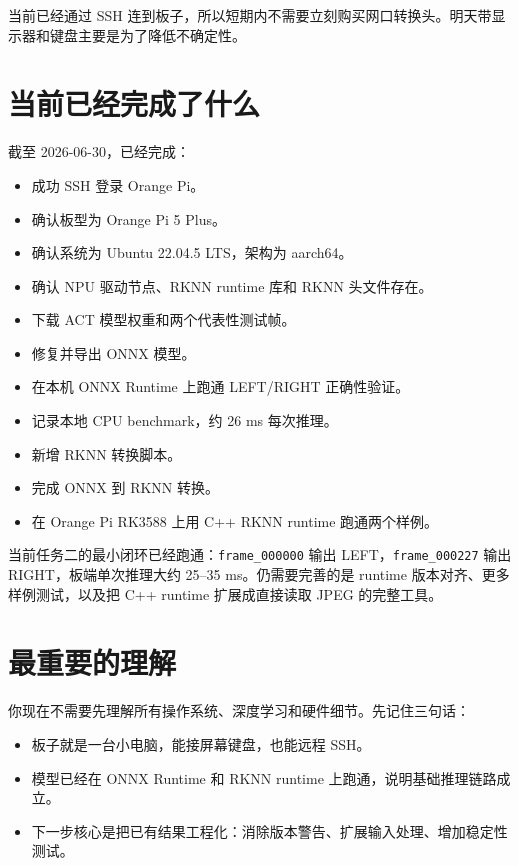 \documentclass[UTF8,a4paper,11pt]{ctexart}
\begin{document}
当前已经通过 SSH 连到板子，所以短期内不需要立刻购买网口转换头。明天带显示器和键盘主要是为了降低不确定性。

\section{当前已经完成了什么}

截至 2026-06-30，已经完成：

\begin{itemize}
  \item 成功 SSH 登录 Orange Pi。
  \item 确认板型为 Orange Pi 5 Plus。
  \item 确认系统为 Ubuntu 22.04.5 LTS，架构为 aarch64。
  \item 确认 NPU 驱动节点、RKNN runtime 库和 RKNN 头文件存在。
  \item 下载 ACT 模型权重和两个代表性测试帧。
  \item 修复并导出 ONNX 模型。
  \item 在本机 ONNX Runtime 上跑通 LEFT/RIGHT 正确性验证。
  \item 记录本地 CPU benchmark，约 26 ms 每次推理。
  \item 新增 RKNN 转换脚本。
  \item 完成 ONNX 到 RKNN 转换。
  \item 在 Orange Pi RK3588 上用 C++ RKNN runtime 跑通两个样例。
\end{itemize}

当前任务二的最小闭环已经跑通：\verb|frame_000000| 输出 LEFT，\verb|frame_000227| 输出 RIGHT，板端单次推理大约 25--35 ms。仍需要完善的是 runtime 版本对齐、更多样例测试，以及把 C++ runtime 扩展成直接读取 JPEG 的完整工具。

\section{最重要的理解}

你现在不需要先理解所有操作系统、深度学习和硬件细节。先记住三句话：

\begin{itemize}
  \item 板子就是一台小电脑，能接屏幕键盘，也能远程 SSH。
  \item 模型已经在 ONNX Runtime 和 RKNN runtime 上跑通，说明基础推理链路成立。
  \item 下一步核心是把已有结果工程化：消除版本警告、扩展输入处理、增加稳定性测试。
\end{itemize}
\end{document}
